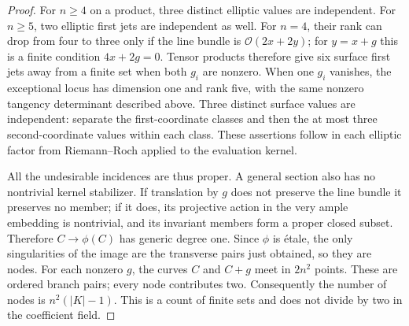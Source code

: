 \documentclass[11pt]{article}
\theoremstyle{definition}\newtheorem{definition}[theorem]{Definition}
\theoremstyle{remark}\newtheorem{remark}[theorem]{Remark}
\newcommand{\OO}{\mathcal O}
\begin{document}
\begin{proof}
For $n\ge4$ on a product, three distinct elliptic values are independent. For $n\ge5$, two elliptic first jets are independent as well. For $n=4$, their rank can drop from four to three only if the line bundle is $\OO(2x+2y)$; for $y=x+g$ this is a finite condition $4x+2g=0$. Tensor products therefore give six surface first jets away from a finite set when both $g_i$ are nonzero. When one $g_i$ vanishes, the exceptional locus has dimension one and rank five, with the same nonzero tangency determinant described above. Three distinct surface values are independent: separate the first-coordinate classes and then the at most three second-coordinate values within each class. These assertions follow in each elliptic factor from Riemann--Roch applied to the evaluation kernel.

All the undesirable incidences are thus proper. A general section also has no nontrivial kernel stabilizer. If translation by $g$ does not preserve the line bundle it preserves no member; if it does, its projective action in the very ample embedding is nontrivial, and its invariant members form a proper closed subset. Therefore $C\to\phi(C)$ has generic degree one. Since $\phi$ is \'etale, the only singularities of the image are the transverse pairs just obtained, so they are nodes. For each nonzero $g$, the curves $C$ and $C+g$ meet in $2n^2$ points. These are ordered branch pairs; every node contributes two. Consequently the number of nodes is $n^2(|K|-1)$. This is a count of finite sets and does not divide by two in the coefficient field.
\end{proof}
\end{document}
